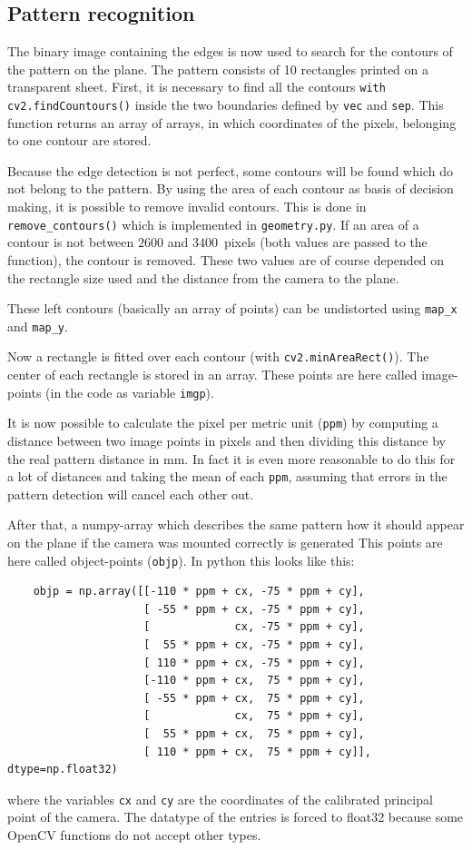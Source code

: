 \subsection{Pattern recognition}
The binary image containing the edges is now used to search for the contours of the pattern on the plane.
The pattern consists of 10 rectangles printed on a transparent sheet.
First, it is necessary to find all the contours \texttt{with cv2.findCountours()} inside the two boundaries defined by \texttt{vec} and \texttt{sep}.
This function returns an array of arrays, in which coordinates of the pixels, belonging to one contour are stored.

Because the edge detection is not perfect, some contours will be found which do not belong to the pattern.
By using the area of each contour as basis of decision making, it is possible to remove invalid contours.
This is done in \texttt{remove\_contours()} which is implemented in \texttt{geometry.py}.
If an area of a contour is not between $2600$ and $3400\,$ pixels (both values are passed to the function), the contour is removed.
These two values are of course depended on the rectangle size used and the distance from the camera to the plane.

These left contours (basically an array of points) can be undistorted using \texttt{map\_x} and \texttt{map\_y}.

Now a rectangle is fitted over each contour (with \texttt{cv2.minAreaRect()}).
The center of each rectangle is stored in an array.
These points are here called image-points (in the code as variable \texttt{imgp}).

It is now possible to calculate the pixel per metric unit (\texttt{ppm}) by computing a distance between two image points in pixels and then dividing this distance by the real pattern distance in mm.
In fact it is even more reasonable to do this for a lot of distances and taking the mean of each \texttt{ppm}, assuming that errors in the pattern detection will cancel each other out.

After that, a numpy-array which describes the same pattern how it should appear on the plane if the camera was mounted correctly is generated
This points are here called object-points (\texttt{objp}).
In python this looks like this:
\begin{lstlisting}
	objp = np.array([[-110 * ppm + cx, -75 * ppm + cy],
	                 [ -55 * ppm + cx, -75 * ppm + cy],
	                 [             cx, -75 * ppm + cy],
	                 [  55 * ppm + cx, -75 * ppm + cy],
	                 [ 110 * ppm + cx, -75 * ppm + cy],
	                 [-110 * ppm + cx,  75 * ppm + cy],
	                 [ -55 * ppm + cx,  75 * ppm + cy],
	                 [             cx,  75 * ppm + cy],
	                 [  55 * ppm + cx,  75 * ppm + cy],
	                 [ 110 * ppm + cx,  75 * ppm + cy]], dtype=np.float32)
\end{lstlisting}
where the variables \texttt{cx} and \texttt{cy} are the coordinates of the calibrated principal point of the camera.
The datatype of the entries is forced to float32 because some OpenCV functions do not accept other types.

